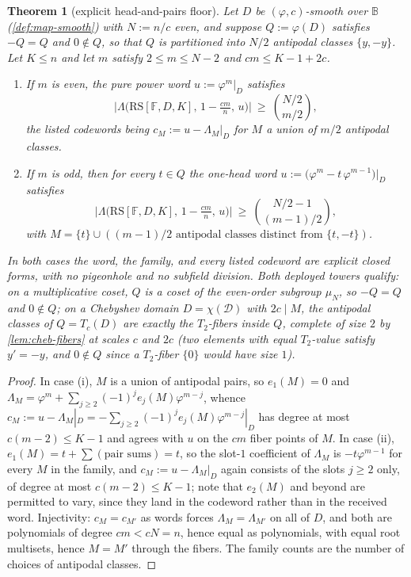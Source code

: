 \documentclass[11pt]{article}
\newtheorem{theorem}{Theorem}[section]
\theoremstyle{definition}
\theoremstyle{remark}
\newcommand{\F}{\mathbb{F}}
\newcommand{\B}{\mathbb{B}}
\newcommand{\RS}{\mathrm{RS}}
\newcommand{\Lst}{\Lambda}
\begin{document}
\begin{theorem}[explicit head-and-pairs floor]\label{thm:explicit-head-floor}
Let $D$ be $(\varphi,c)$-smooth over $\B$ \textup(\cref{def:map-smooth}\textup) with $N:=n/c$ even, and suppose $Q:=\varphi(D)$ satisfies $-Q=Q$ and $0\notin Q$, so that $Q$ is partitioned into $N/2$ antipodal classes $\{y,-y\}$. Let $K\le n$ and let $m$ satisfy $2\le m\le N-2$ and $cm\le K-1+2c$.
\begin{enumerate}[label=\textup{(\roman*)}]
\item If $m$ is even, the \emph{pure power word} $u:=\varphi^m|_D$ satisfies
\[
\bigl|\Lst\bigl(\RS[\F,D,K],\,1-\tfrac{cm}n,\,u\bigr)\bigr|\ \ge\ \binom{N/2}{m/2},
\]
the listed codewords being $c_M:=u-\Lambda_M|_D$ for $M$ a union of $m/2$ antipodal classes.
\item If $m$ is odd, then for every $t\in Q$ the \emph{one-head word} $u:=\bigl(\varphi^m-t\,\varphi^{m-1}\bigr)|_D$ satisfies
\[
\bigl|\Lst\bigl(\RS[\F,D,K],\,1-\tfrac{cm}n,\,u\bigr)\bigr|\ \ge\ \binom{N/2-1}{(m-1)/2},
\]
with $M=\{t\}\cup(\text{$(m-1)/2$ antipodal classes distinct from $\{t,-t\}$})$.
\end{enumerate}
In both cases the word, the family, and every listed codeword are explicit closed forms, with no pigeonhole and no subfield division. Both deployed towers qualify: on a multiplicative coset, $Q$ is a coset of the even-order subgroup $\mu_N$, so $-Q=Q$ and $0\notin Q$; on a Chebyshev domain $D=\chi(\mathcal D)$ with $2c\mid M$, the antipodal classes of $Q=T_c(D)$ are exactly the $T_2$-fibers inside $Q$, complete of size $2$ by \cref{lem:cheb-fibers} at scales $c$ and $2c$ \textup(two elements with equal $T_2$-value satisfy $y'=-y$, and $0\notin Q$ since a $T_2$-fiber $\{0\}$ would have size $1$\textup).
\end{theorem}

\begin{proof}
In case \textup{(i)}, $M$ is a union of antipodal pairs, so $e_1(M)=0$ and $\Lambda_M=\varphi^m+\sum_{j\ge2}(-1)^je_j(M)\varphi^{m-j}$, whence $c_M:=u-\Lambda_M|_D=-\sum_{j\ge2}(-1)^je_j(M)\varphi^{m-j}|_D$ has degree at most $c(m-2)\le K-1$ and agrees with $u$ on the $cm$ fiber points of $M$. In case \textup{(ii)}, $e_1(M)=t+\sum(\text{pair sums})=t$, so the slot-$1$ coefficient of $\Lambda_M$ is $-t\varphi^{m-1}$ for every $M$ in the family, and $c_M:=u-\Lambda_M|_D$ again consists of the slots $j\ge2$ only, of degree at most $c(m-2)\le K-1$; note that $e_2(M)$ and beyond are permitted to vary, since they land in the codeword rather than in the received word. Injectivity: $c_M=c_{M'}$ as words forces $\Lambda_M=\Lambda_{M'}$ on all of $D$, and both are polynomials of degree $cm<cN=n$, hence equal as polynomials, with equal root multisets, hence $M=M'$ through the fibers. The family counts are the number of choices of antipodal classes.
\end{proof}
\end{document}
